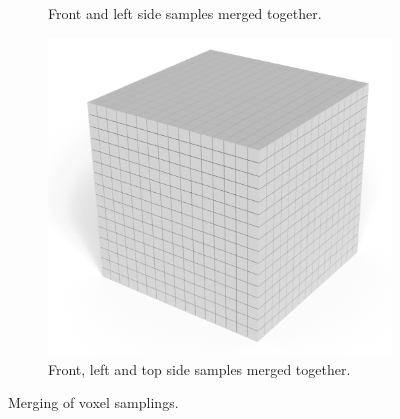\begin{figure}[h]
\begin{subfigure}[t]{0.3\textwidth}
        \caption{Front and left side samples merged together.}
        \label{fig:filling-watertight-model}
    \end{subfigure}
    \hfill
    \begin{subfigure}[t]{0.3\textwidth}
        \centering
        \includegraphics[width=\textwidth]{sections/methodology/figures/voxels-merge-3.png}
        \caption{Front, left and top side samples merged together.}
        \label{fig:filling-watertight-model}
    \end{subfigure}
       \caption{Merging of voxel samplings.}
       \label{fig:voxel-sample-merging}
\end{figure}

